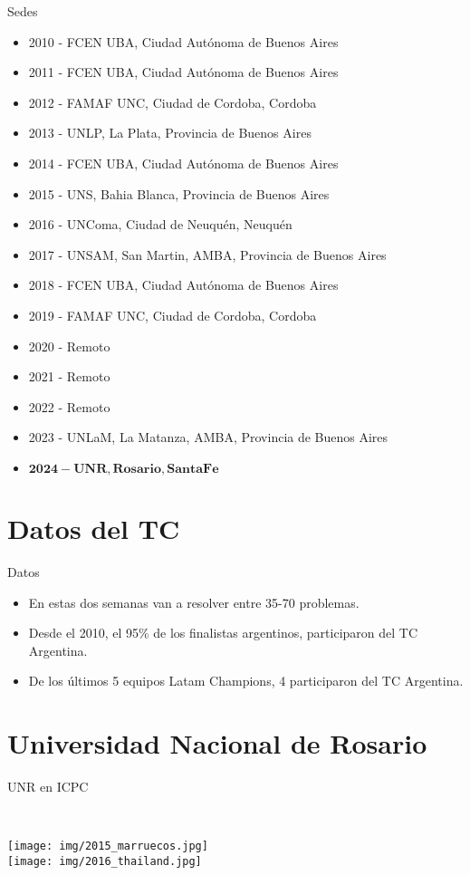 \documentclass{beamer}
\begin{document}
\begin{frame}{Sedes}
    \begin{itemize}
        \item 2010 - FCEN UBA, Ciudad Autónoma de Buenos Aires
        \item 2011 - FCEN UBA, Ciudad Autónoma de Buenos Aires
        \item 2012 - FAMAF UNC, Ciudad de Cordoba, Cordoba
        \item 2013 - UNLP, La Plata, Provincia de Buenos Aires
        \item 2014 - FCEN UBA, Ciudad Autónoma de Buenos Aires
        \item 2015 - UNS, Bahia Blanca, Provincia de Buenos Aires
        \item 2016 - UNComa, Ciudad de Neuquén, Neuquén
        \item 2017 - UNSAM, San Martin, AMBA, Provincia de Buenos Aires
        \item 2018 - FCEN UBA, Ciudad Autónoma de Buenos Aires
        \item 2019 - FAMAF UNC, Ciudad de Cordoba, Cordoba
        \item 2020 - Remoto
        \item 2021 - Remoto
        \item 2022 - Remoto
        \item 2023 - UNLaM, La Matanza, AMBA, Provincia de Buenos Aires
        \item $\bm{2024 - UNR, Rosario, Santa Fe}$
    \end{itemize}
\end{frame}

\section{Datos del TC}
\begin{frame}{Datos}
    \begin{itemize}
        \item En estas dos semanas van a resolver entre 35-70 problemas.
        \item Desde el 2010, el 95\% de los finalistas argentinos, participaron del TC Argentina.
        \item De los últimos 5 equipos Latam Champions, 4 participaron del TC Argentina.
    \end{itemize}
\end{frame}

\section{Universidad Nacional de Rosario}
\begin{frame}{UNR en ICPC}
    \begin{columns}[t]
        \\
        \texttt{[image: img/2015\_marruecos.jpg]}
        \\
        \texttt{[image: img/2016\_thailand.jpg]}
    \end{columns}
\end{frame}
\end{document}
